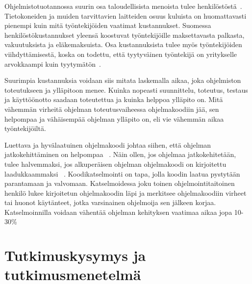 \documentclass[finnish]{tktltiki2}
\theoremstyle{definition}
\theoremstyle{remark}
\begin{document}
Ohjelmistotuotannossa suurin osa taloudellisista menoista tulee henkilöstöstä~\cite{haikala1995ohjelmistotuotanto}. Tietokoneiden ja muiden tarvittavien laitteiden osuus kuluista on huomattavasti pienempi kuin mitä työntekijöiden vaatimat kustannukset. Suomessa henkilöstökustannukset yleensä koostuvat työntekijöille maksettavasta palkasta, vakuutuksista ja eläkemaksuista. Osa kustannuksista tulee myös työntekijöiden viihdyttämisestä, koska on todettu, että tyytyväinen työntekijä on yritykselle arvokkaampi kuin tyytymätön~\cite{airo2008oma}.

Suurimpia kustannuksia voidaan siis mitata laskemalla aikaa, joka ohjelmiston toteutukseen ja ylläpitoon menee. Kuinka nopeasti suunnittelu, toteutus, testaus ja käyttöönotto saadaan toteutettua ja kuinka helppoa ylläpito on.  Mitä vähemmän virheitä ohjelman toteutusvaiheessa ohjelmakoodiin jää, sen helpompaa ja vähäisempää ohjelman ylläpito on, eli vie vähemmän aikaa työntekijöiltä.

Luettava ja hyvälaatuinen ohjelmakoodi johtaa siihen, että ohjelman jatkokehittäminen on helpompaa ~\cite{johnson1994instrumented}. Näin ollen, jos ohjelmaa jatkokehitetään, tulee halvemmaksi, jos alkuperäisen ohjelman ohjelmakoodi on kirjoitettu laadukkaammaksi ~\cite{fagan2001design}. Koodikatselmointi on tapa, jolla koodin laatua pystytään parantamaan ja valvomaan. Katselmoidessa joku toinen ohjelmointitaitoinen henkilö lukee kirjoitetun ohjelmakoodin läpi ja merkitsee ohjelmakoodiin virheet tai huonot käytänteet, jotka varsinainen ohjelmoija sen jälkeen korjaa. Katselmoinnilla voidaan vähentää ohjelman kehityksen vaatimaa aikaa jopa 10-30\%~\cite{gilb1993software}


\section{Tutkimuskysymys ja tutkimusmenetelmä}
\end{document}
